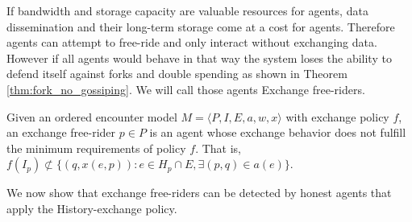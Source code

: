 If bandwidth and storage capacity are valuable resources for agents, data dissemination and their 
long-term storage come at a cost for agents. Therefore agents can attempt to free-ride and only 
interact without exchanging data. However if all agents would behave in that way the system loses 
the ability to defend itself against forks and double spending as shown in Theorem 
\ref{thm:fork_no_gossiping}. We will call those agents Exchange free-riders. 



\begin{defn}
    \label{def:gos_free-rider}
    Given an ordered encounter model $M = \langle P, I, E, a, w, x \rangle$ with exchange policy $f$, an exchange free-rider $p \in P$ is an 
    agent whose exchange behavior does not fulfill the minimum requirements of policy $f$. That is, 
    $f(I_p) \nsubset \{ (q, x(e, p)) : e \in H_p \cap E, \exists (p, q) \in a(e)\}$.
\end{defn}

We now show that exchange free-riders can be detected by honest agents that apply the History-exchange
policy.

